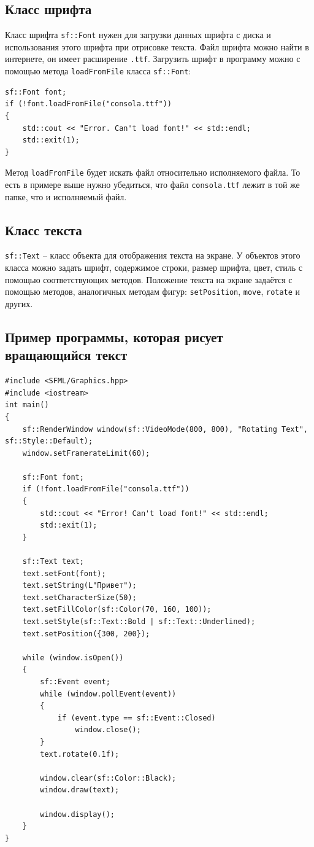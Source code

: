 \documentclass{article}
\begin{document}
\subsection*{Класс шрифта}
Класс шрифта \texttt{sf::Font} нужен для загрузки данных шрифта с диска и использования этого шрифта при отрисовке текста. Файл шрифта можно найти в интернете, он имеет расширение \texttt{.ttf}. Загрузить шрифт в программу можно с помощью метода \texttt{loadFromFile} класса \texttt{sf::Font}:
\begin{lstlisting}
sf::Font font;
if (!font.loadFromFile("consola.ttf")) 
{
    std::cout << "Error. Can't load font!" << std::endl;
    std::exit(1);
}
\end{lstlisting}
Метод \texttt{loadFromFile} будет искать файл относительно исполняемого файла. То есть в примере выше нужно убедиться, что файл \texttt{consola.ttf} лежит в той же папке, что и исполняемый файл.

\subsection*{Класс текста}
\texttt{sf::Text} -- класс объекта для отображения текста на экране.
У объектов этого класса можно задать шрифт, содержимое строки, размер шрифта, цвет, стиль с помощью соответствующих методов. Положение текста на экране задаётся с помощью методов, аналогичных методам фигур: \texttt{setPosition}, \texttt{move}, \texttt{rotate} и других.

\subsection*{Пример программы, которая рисует вращающийся текст}
\begin{lstlisting}
#include <SFML/Graphics.hpp>
#include <iostream>
int main()
{
    sf::RenderWindow window(sf::VideoMode(800, 800), "Rotating Text", sf::Style::Default);
    window.setFramerateLimit(60);
    
    sf::Font font;
    if (!font.loadFromFile("consola.ttf")) 
    {
        std::cout << "Error! Can't load font!" << std::endl;
        std::exit(1);
    }

    sf::Text text;
    text.setFont(font);
    text.setString(L"Привет");
    text.setCharacterSize(50);
    text.setFillColor(sf::Color(70, 160, 100));
    text.setStyle(sf::Text::Bold | sf::Text::Underlined);
    text.setPosition({300, 200});

    while (window.isOpen())
    {
        sf::Event event;
        while (window.pollEvent(event)) 
        {
            if (event.type == sf::Event::Closed)
                window.close();
        }
        text.rotate(0.1f);

        window.clear(sf::Color::Black);
        window.draw(text);

        window.display();
    }
}
\end{lstlisting}
\end{document}
